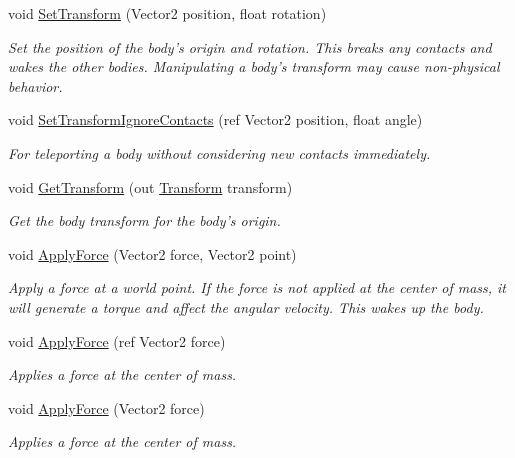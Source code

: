 \begin{DoxyCompactItemize}
void \hyperlink{class_farseer_physics_1_1_dynamics_1_1_body_a3cd2d427d5970dd692f00b422ead9717}{Set\+Transform} (Vector2 position, float rotation)
\begin{DoxyCompactList}\small\item\em Set the position of the body's origin and rotation. This breaks any contacts and wakes the other bodies. Manipulating a body's transform may cause non-\/physical behavior. \end{DoxyCompactList}\item 
void \hyperlink{class_farseer_physics_1_1_dynamics_1_1_body_af2338dc0af714946eb20e5debe78fa75}{Set\+Transform\+Ignore\+Contacts} (ref Vector2 position, float angle)
\begin{DoxyCompactList}\small\item\em For teleporting a body without considering new contacts immediately. \end{DoxyCompactList}\item 
void \hyperlink{class_farseer_physics_1_1_dynamics_1_1_body_a0dacc6ab845919e3c69b132c35bae05d}{Get\+Transform} (out \hyperlink{struct_farseer_physics_1_1_common_1_1_transform}{Transform} transform)
\begin{DoxyCompactList}\small\item\em Get the body transform for the body's origin. \end{DoxyCompactList}\item 
void \hyperlink{class_farseer_physics_1_1_dynamics_1_1_body_ab9a39313a0e36e4825f4b91213e61c7d}{Apply\+Force} (Vector2 force, Vector2 point)
\begin{DoxyCompactList}\small\item\em Apply a force at a world point. If the force is not applied at the center of mass, it will generate a torque and affect the angular velocity. This wakes up the body. \end{DoxyCompactList}\item 
void \hyperlink{class_farseer_physics_1_1_dynamics_1_1_body_a8fcc4341298fb142b1e39bcdbf2ec6a5}{Apply\+Force} (ref Vector2 force)
\begin{DoxyCompactList}\small\item\em Applies a force at the center of mass. \end{DoxyCompactList}\item 
void \hyperlink{class_farseer_physics_1_1_dynamics_1_1_body_abf8e0a5749c21659059269a34289dffd}{Apply\+Force} (Vector2 force)
\begin{DoxyCompactList}\small\item\em Applies a force at the center of mass. \end{DoxyCompactList}\item 

\end{DoxyCompactItemize}
